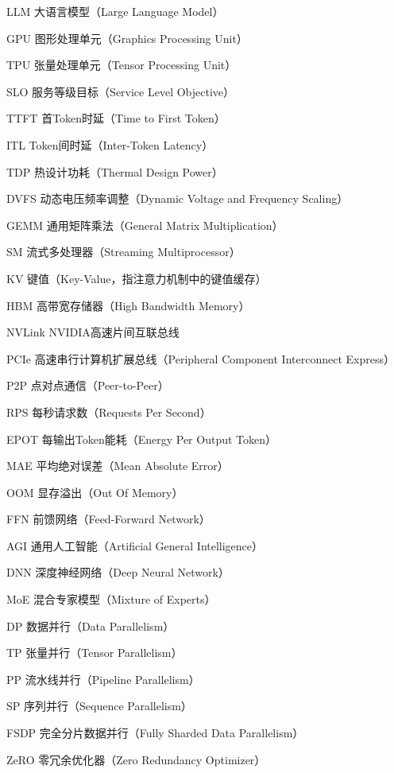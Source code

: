 
\begin{denotation}[3.5cm]
  \item[LLM] 大语言模型（Large Language Model）
  \item[GPU] 图形处理单元（Graphics Processing Unit）
  \item[TPU] 张量处理单元（Tensor Processing Unit）
  \item[SLO] 服务等级目标（Service Level Objective）
  \item[TTFT] 首Token时延（Time to First Token）
  \item[ITL] Token间时延（Inter-Token Latency）
  \item[TDP] 热设计功耗（Thermal Design Power）
  \item[DVFS] 动态电压频率调整（Dynamic Voltage and Frequency Scaling）
  \item[GEMM] 通用矩阵乘法（General Matrix Multiplication）
  \item[SM] 流式多处理器（Streaming Multiprocessor）
  \item[KV] 键值（Key-Value，指注意力机制中的键值缓存）
  \item[HBM] 高带宽存储器（High Bandwidth Memory）
  \item[NVLink] NVIDIA高速片间互联总线
  \item[PCIe] 高速串行计算机扩展总线（Peripheral Component Interconnect Express）
  \item[P2P] 点对点通信（Peer-to-Peer）
  \item[RPS] 每秒请求数（Requests Per Second）
  \item[EPOT] 每输出Token能耗（Energy Per Output Token）
  \item[MAE] 平均绝对误差（Mean Absolute Error）
  \item[OOM] 显存溢出（Out Of Memory）
  \item[FFN] 前馈网络（Feed-Forward Network）
  \item[AGI] 通用人工智能（Artificial General Intelligence）
  \item[DNN] 深度神经网络（Deep Neural Network）
  \item[MoE] 混合专家模型（Mixture of Experts）

  \item[DP] 数据并行（Data Parallelism）
  \item[TP] 张量并行（Tensor Parallelism）
  \item[PP] 流水线并行（Pipeline Parallelism）
  \item[SP] 序列并行（Sequence Parallelism）
  \item[FSDP] 完全分片数据并行（Fully Sharded Data Parallelism）
  \item[ZeRO] 零冗余优化器（Zero Redundancy Optimizer）


\end{denotation}
